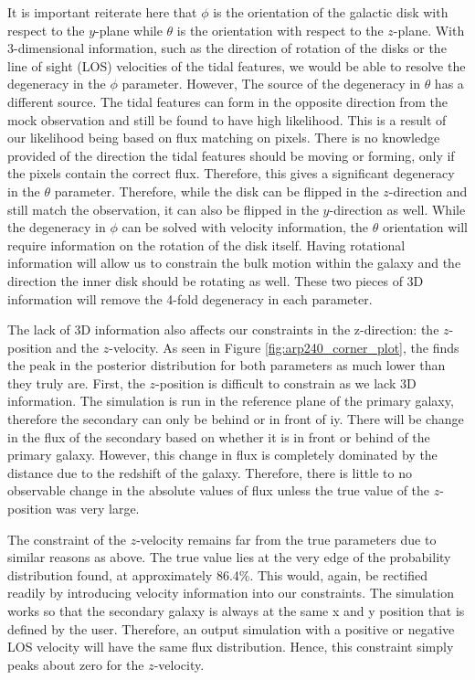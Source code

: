 It is important reiterate here that $\phi$ is the orientation of the galactic disk with respect to the $y$-plane while $\theta$ is the orientation with respect to the $z$-plane. With 3-dimensional information, such as the direction of rotation of the disks or the line of sight (LOS) velocities of the tidal features, we would be able to resolve the degeneracy in the $\phi$ parameter. However, The source of the degeneracy in $\theta$ has a different source. The tidal features can form in the opposite direction from the mock observation and still be found to have high likelihood. This is a result of our likelihood being based on flux matching on pixels. There is no knowledge provided of the direction the tidal features should be moving or forming, only if the pixels contain the correct flux. Therefore, this gives a significant degeneracy in the $\theta$ parameter. Therefore, while the disk can be flipped in the $z$-direction and still match the observation, it can also be flipped in the $y$-direction as well. While the degeneracy in $\phi$ can be solved with velocity information, the $\theta$ orientation will require information on the rotation of the disk itself. Having rotational information will allow us to constrain the bulk motion within the galaxy and the direction the inner disk should be rotating as well. These two pieces of 3D information will remove the 4-fold degeneracy in each parameter.

The lack of 3D information also affects our constraints in the z-direction: the $z$-position and the $z$-velocity. As seen in Figure \ref{fig:arp240_corner_plot}, the finds the peak in the posterior distribution for both parameters as much lower than they truly are. First, the $z$-position is difficult to constrain as we lack 3D information. The simulation is run in the reference plane of the primary galaxy, therefore the secondary can only be behind or in front of iy. There will be change in the flux of the secondary based on whether it is in front or behind of the primary galaxy. However, this change in flux is completely dominated by the distance due to the redshift of the galaxy. Therefore, there is little to no observable change in the absolute values of flux unless the true value of the $z$-position was very large.

The constraint of the $z$-velocity remains far from the true parameters due to similar reasons as above. The true value lies at the very edge of the probability distribution found, at approximately 86.4\%. This would, again, be rectified readily by introducing velocity information into our constraints. The simulation works so that the secondary galaxy is always at the same x and y position that is defined by the user. Therefore, an output simulation with a positive or negative LOS velocity will have the same flux distribution. Hence, this constraint simply peaks about zero for the $z$-velocity.

